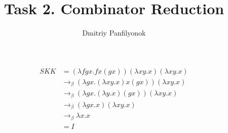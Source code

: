 \documentclass{article}
\title{Task 2. Combinator Reduction}
\author{Dmitriy Panfilyonok}
\date{}
\begin{document}
    \maketitle
    
    \paragraph{}
    \begin{align*}
        SKK & = (\lambda fgx.fx(gx))(\lambda xy.x)(\lambda xy.x) \\
        & \rightarrow_\beta (\lambda gx.(\lambda xy.x)x(gx))(\lambda xy.x) \\
        & \rightarrow_\beta (\lambda gx.(\lambda y.x)(gx))(\lambda xy.x) \\
        & \rightarrow_\beta (\lambda gx.x)(\lambda xy.x) \\
        & \rightarrow_\beta \lambda x.x \\ 
        & = I
    \end{align*}
    
\end{document}
